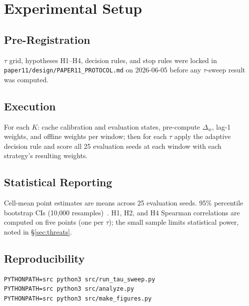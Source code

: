 \section{Experimental Setup}

\subsection{Pre-Registration}

$\tau$ grid, hypotheses H1--H4, decision rules, and stop rules were
locked in \texttt{paper11/design/PAPER11\_PROTOCOL.md} on 2026-06-05
before any $\tau$-sweep result was computed.

\subsection{Execution}

For each $K$: cache calibration and evaluation states, pre-compute
$\Delta_w$, lag-1 weights, and offline weights per window; then for
each $\tau$ apply the adaptive decision rule and score all 25 evaluation
seeds at each window with each strategy's resulting weights.

\subsection{Statistical Reporting}

Cell-mean point estimates are means across 25 evaluation seeds. 95\%
percentile bootstrap CIs (10{,}000 resamples)~\cite{efron1994introduction}.
H1, H2, and H4 Spearman correlations are computed on five points
(one per $\tau$); the small sample limits statistical power, noted
in \S\ref{sec:threats}.

\subsection{Reproducibility}

{\small\begin{verbatim}
PYTHONPATH=src python3 src/run_tau_sweep.py
PYTHONPATH=src python3 src/analyze.py
PYTHONPATH=src python3 src/make_figures.py
\end{verbatim}}

